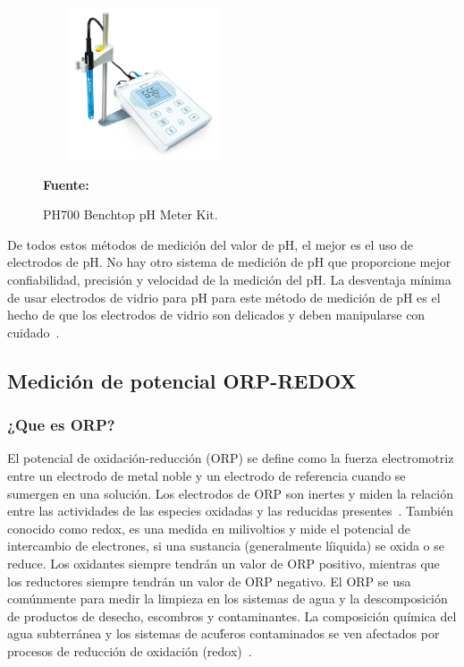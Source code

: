 \begin{itemize}
\begin{figure}[ht]
    \centering
    \includegraphics[width=60mm, height=45mm]{Imagenes/cap2/ph700.png}
    \caption {PH700 Benchtop pH Meter Kit. }{\textbf{Fuente:}
    \cite{ph700_nodate} }
    \label{fig:ph700}
    \end{figure}
\end{itemize}

De todos estos métodos de medición del valor de pH,  el mejor es el uso de electrodos de pH. 
No hay otro sistema de medición de pH que proporcione mejor confiabilidad, precisión y velocidad de la medición del pH. 
La desventaja mínima de usar electrodos de vidrio para pH para este m\'etodo de medici\'on de pH es el hecho de que los electrodos de vidrio son delicados y deben manipularse con cuidado~\cite{li_chapter_2019}.


\subsection{Medición de potencial ORP-REDOX}
\subsubsection{¿Que es ORP?}
El potencial de oxidaci\'on-reducci\'on (ORP) se define como la fuerza electromotriz entre un electrodo de metal noble y un electrodo de referencia cuando se sumergen en una soluci\'on.
Los electrodos de ORP son inertes y miden la relaci\'on entre las actividades de las especies oxidadas y las reducidas presentes~\cite{d19_committee_test_nodate}.
Tambi\'en conocido como redox, es una medida en milivoltios y mide el potencial de intercambio de electrones, si una sustancia (generalmente l\'iiquida) se oxida o se reduce. 
Los oxidantes siempre tendrán un valor de ORP positivo, mientras que los reductores siempre tendrán un valor de ORP negativo. 
El ORP se usa com\'unmente para medir la limpieza en los sistemas de agua y la descomposici\'on de productos de desecho, escombros y contaminantes. 
La composici\'on química del agua subterránea y los sistemas de acu\'feros contaminados se ven afectados por procesos de reducción de oxidación (redox)~\cite{wator_redox_2020}.


